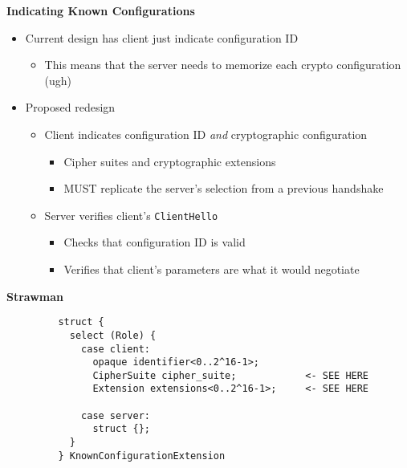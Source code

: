 \documentclass[helvetica]{seminar}
\newcommand{\heading}[1]{%
  \begin{center} 
    \large\bf 
    #1 
  \end{center} 
  \vspace{.4 in}}
\begin{document}
\begin{slide}
\heading{Indicating Known Configurations}

\begin{itemize}
\item Current design has client just indicate configuration ID
  \begin{itemize}
  \item This means that the server needs to memorize each crypto configuration (ugh)
  \end{itemize}

\item Proposed redesign
  \begin{itemize}
  \item Client indicates configuration ID \emph{and} cryptographic configuration
    \begin{itemize}
    \item Cipher suites and cryptographic extensions
    \item MUST replicate the server's selection from a previous handshake
    \end{itemize}
  \item Server verifies client's \verb^ClientHello^
    \begin{itemize}
    \item Checks that configuration ID is valid
    \item Verifies that client's parameters are what it would negotiate
    \end{itemize}
  \end{itemize}
\end{itemize}
\end{slide}


\begin{slide}
\heading{Strawman}

\begin{footnotesize}
\begin{verbatim}
         struct {
           select (Role) {
             case client:
               opaque identifier<0..2^16-1>;
               CipherSuite cipher_suite;            <- SEE HERE
               Extension extensions<0..2^16-1>;     <- SEE HERE       

             case server:
               struct {};
           }
         } KnownConfigurationExtension
\end{verbatim}
\end{footnotesize}
\end{slide}
\end{document}
